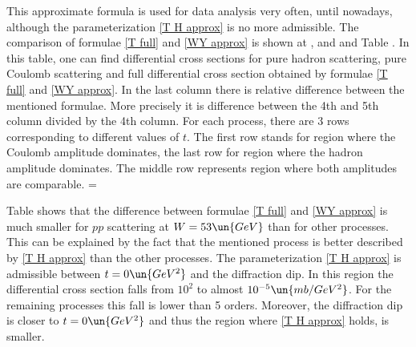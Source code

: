 This approximate formula is used for data analysis very often, until nowadays, although the parameterization \ref{T H approx} is no more admissible. The comparison of formulae \ref{T full} and \ref{WY approx} is shown at \fgs{} ,  and  and Table . In this table, one can find differential cross sections for pure hadron scattering, pure Coulomb scattering and full differential cross section obtained by formulae \ref{T full} and \ref{WY approx}. In the last column there is relative difference between the mentioned formulae. More precisely it is difference between the 4th and 5th column divided by the 4th column. For each process, there are 3 rows corresponding to different values of $t$. The first row stands for region where the Coulomb amplitude dominates, the last row for region where the hadron amplitude dominates. The middle row represents region where both amplitudes are comparable.
\bgroup
\setbox\strutbox=\hbox{\vrule height13pt depth5pt width0pt}
\egroup

Table  shows that the difference between formulae \ref{T full} and \ref{WY approx} is much smaller for $pp$ scattering at $W = 53\un{GeV}$ than for other processes. This can be explained by the fact that the mentioned process is better described by \ref{T H approx} than the other processes. The parameterization \ref{T H approx} is admissible between $t = 0\un{GeV^2}$ and the diffraction dip. In this region the differential cross section falls from $10^2$ to almost $10^{-5}\un{mb/GeV^2}$. For the remaining processes this fall is lower than 5 orders. Moreover, the diffraction dip is closer to $t = 0\un{GeV^2}$ and thus the region where \ref{T H approx} holds, is smaller.

